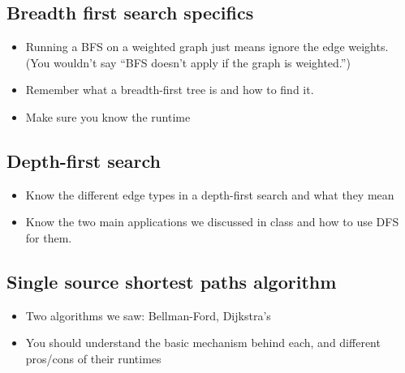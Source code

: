 \documentclass[11  pt]{exam}
\begin{document}
	\subsection{Breadth first search specifics}

	\begin{itemize}	
		\item Running a BFS on a weighted graph just means ignore the edge weights. (You wouldn't say ``BFS doesn't apply if the graph is weighted.'')
		\item Remember what a breadth-first tree is and how to find it.
		\item Make sure you know the runtime
	\end{itemize}


	\subsection{Depth-first search}
		\begin{itemize}	
			\item Know the different edge types in a depth-first search and what they mean
			\item Know the two main applications we discussed in class and how to use DFS for them.
		\end{itemize}


	\subsection{Single source shortest paths algorithm}

\begin{itemize}	
	\item Two algorithms we saw: Bellman-Ford, Dijkstra's %
	\item You should understand the basic mechanism behind each, and different pros/cons of their runtimes
\end{itemize}
\end{document}
